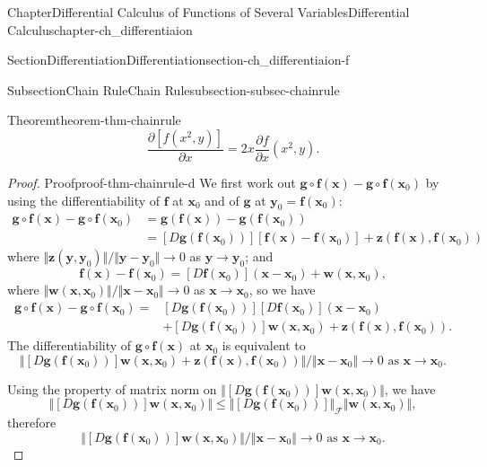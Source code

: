 \documentclass[oneside,10pt,]{book}
\numberwithin{equation}{section}
\newcommand{\bw}{\mathbf{w}}
\newcommand{\bx}{\mathbf{x}}
\newcommand{\by}{\mathbf{y}}
\newcommand{\bz}{\mathbf{z}}
\newcommand{\cF}{\mathcal{F}}
\newcommand{\amp}{&}
\begin{document}
\begin{chapterptx}{Chapter}{Differential Calculus of Functions of Several Variables}{}{Differential Calculus}{}{}{chapter-ch_differentiaion}
\begin{sectionptx}{Section}{Differentiation}{}{Differentiation}{}{}{section-ch_differentiaion-f}
\begin{subsectionptx}{Subsection}{Chain Rule}{}{Chain Rule}{}{}{subsection-subsec-chainrule}
\begin{theorem}{Theorem}{}{}{theorem-thm-chainrule}
\begin{equation*}
\frac{\partial \left[ f(x^{2}, y)\right]}{\partial x}= 2x \frac{\partial f}{\partial x}(x^{2}, y).
\end{equation*}
%
\end{theorem}
\begin{proof}{Proof}{}{proof-thm-chainrule-d}
We first work out \(\mathbf g \circ \mathbf f(\bx) - \mathbf g \circ \mathbf f(\bx_0)\) by using the differentiability of \(\mathbf f\) at \(\bx_0\) and of \(\mathbf g\) at \(\by_0=\mathbf f(\bx_0)\):%
\begin{align*}
\mathbf g \circ \mathbf f(\bx) - \mathbf g \circ \mathbf f(\bx_0) \amp
= \mathbf g (\mathbf f(\bx)) - \mathbf g ( \mathbf f(\bx_0)) \\
\amp = [D\mathbf g(\mathbf f(\bx_0))] \left[ \mathbf f(\bx)- \mathbf f(\bx_0)\right] +\bz(\mathbf f(\bx), \mathbf f(\bx_0))
\end{align*}
where \(\Vert \bz(\by, \by_0)\Vert/\Vert \by -\by_0\Vert \to 0\) as \(\by \to \by_0\); and%
\begin{equation*}
\mathbf f(\bx) - \mathbf f(\bx_0)=[D\mathbf f(\bx_0)](\bx -\bx_0) +\bw (\bx, \bx_0),
\end{equation*}
where \(\Vert \bw(\bx, \bx_0)\Vert/\Vert \bx -\bx_0\Vert \to 0\) as \(\bx \to \bx_0\), so we have%
\begin{align*}
\mathbf g \circ \mathbf f(\bx) - \mathbf g \circ \mathbf f(\bx_0)
=\amp [D\mathbf g (\mathbf f(\bx_0))][D\mathbf f(\bx_0)](\bx -\bx_0)\\
\amp + [D\mathbf g (\mathbf f(\bx_0))]\bw(\bx, \bx_0) 
+ \bz(\mathbf f(\bx), \mathbf f(\bx_0)).
\end{align*}
The differentiability of \(\mathbf g \circ \mathbf f(\bx)\) at \(\bx_0\) is equivalent to%
\begin{equation*}
\Vert [D\mathbf g (\mathbf f(\bx_0))]\bw(\bx, \bx_0) 
+ \bz(\mathbf f(\bx), \mathbf f(\bx_0)) \Vert/\Vert \bx -\bx_0\Vert \to 0  \text{ as } \bx \to \bx_0.
\end{equation*}
%
\par
Using the property of matrix norm on \(\Vert [D\mathbf g (\mathbf f(\bx_0))]\bw(\bx, \bx_0) \Vert\), we have%
\begin{equation*}
\Vert [D\mathbf g (\mathbf f(\bx_0))]\bw(\bx, \bx_0) \Vert \le
\Vert [D\mathbf g (\mathbf f(\bx_0))]\Vert_{\cF} \Vert\bw(\bx, \bx_0) \Vert,
\end{equation*}
therefore%
\begin{equation*}
\Vert [D\mathbf g (\mathbf f(\bx_0))]\bw(\bx, \bx_0) \Vert/\Vert \bx -\bx_0\Vert \to 0  \text{ as } \bx \to \bx_0.

\end{equation*}
\end{proof}
\end{subsectionptx}
\end{sectionptx}
\end{chapterptx}
\end{document}
